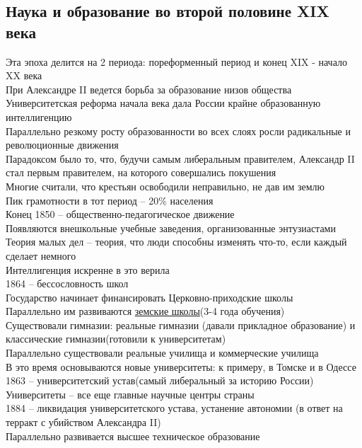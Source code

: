 \documentclass[12pt]{article}
\begin{document}
\subsection*{Наука и образование во второй половине XIX века}
Эта эпоха делится на 2 периода: пореформенный период и конец XIX - начало XX века\\
При Александре II ведется борьба за образование низов общества\\
Университетская реформа начала века дала России крайне образованную интеллигенцию\\
Параллельно резкому росту образованности во всех слоях росли радикальные и революционные движения\\
Парадоксом было то, что, будучи самым либеральным правителем, Александр II стал первым правителем, на которого совершались покушения\\
Многие считали, что крестьян освободили неправильно, не дав им землю\\
Пик грамотности в тот период -- 20\% населения\\
Конец 1850 -- общественно-педагогическое движение\\
Появляются внешкольные учебные заведения, организованные энтузиастами\\
Теория малых дел -- теория, что люди способны изменять что-то, если каждый сделает немного\\
Интеллигенция искренне в это верила\\
1864 -- бессословность школ\\
Государство начинает финансировать Церковно-приходские школы\\
Параллельно им развиваются \underline{земские школы}(3-4 года обучения)\\
Существовали гимназии: реальные гимназии (давали прикладное образование) и классические гимназии(готовили к университетам)\\
Параллельно существовали реальные училища и коммерческие училища\\
В это время основываются новые университеты: к примеру, в Томске и в Одессе\\
1863 -- университетский устав(самый либеральный за историю России)\\
Университеты -- все еще главные научные центры страны\\
1884 -- ликвидация университетского устава, устанение автономии (в ответ на терракт с убийством Александра II)\\
Параллельно развивается высшее техническое образование\\
\end{document}
